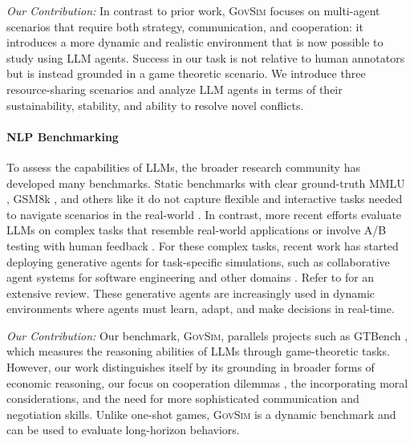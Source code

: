 \documentclass{article}
\newcommand{\envAbbr}{\textsc{GovSim}\xspace}
\begin{document}
%



\textit{Our Contribution:}
%
In contrast to prior work, \envAbbr focuses on multi-agent scenarios that require both strategy, communication, and cooperation: it introduces a more dynamic and realistic environment that is now possible to study using LLM agents. Success in our task is not relative to human annotators but is instead grounded in a game theoretic scenario. We introduce three resource-sharing scenarios and analyze LLM agents in terms of their sustainability, stability, and ability to resolve novel conflicts.


%

%
%

%

\paragraph{NLP Benchmarking}

To assess the capabilities of LLMs, the broader research community has developed many benchmarks. Static benchmarks with clear ground-truth MMLU \citep{hendrycks2020measuring}, GSM8k \citep{cobbe2021training}, and others like it do not capture flexible and interactive tasks needed to navigate scenarios in the real-world \citep{liao2021we,gehrmann2023repairing,zheng2024judging}. In contrast, more recent efforts evaluate LLMs on complex tasks that resemble real-world applications \citep{zhou2023webarena,kinniment2023evaluating,deng2024mind2web} or involve A/B testing with human feedback \citep{chiang2024chatbot}. For these complex tasks, recent work has started deploying generative agents \citep{park2022social, park2023generative} for task-specific simulations, such as collaborative agent systems for software engineering \citep{hong2023metagpt,nair2023dera, zhang2023exploring,li2024camel} and other domains \citep{lin2023agentsims, wang2023humanoid, kaiya2023lyfe, hua2023war}. Refer to \citet{xi2023rise} for an extensive review. These generative agents are increasingly used in dynamic environments where agents must learn, adapt, and make decisions in real-time. 

\textit{Our Contribution:}
Our benchmark, \envAbbr, parallels projects such as GTBench \citet{duan2024gtbench}, which measures the reasoning abilities of LLMs through game-theoretic tasks. However, our work distinguishes itself by its grounding in broader forms of economic reasoning, our focus on cooperation dilemmas \citep{ostrom1990governing, hardin1968tragedy}, the incorporating moral considerations, and the need for more sophisticated communication and negotiation skills. Unlike one-shot games, \envAbbr is a dynamic benchmark and can be used to evaluate long-horizon behaviors.
\end{document}
